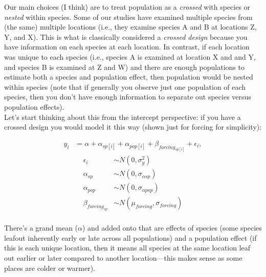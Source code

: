 \documentclass[11pt,letter]{article}
\begin{document}
Our main choices (I think) are to treat population as a \emph{crossed} with species or \emph{nested} within species. Some of our studies have examined multiple species from (the same) multiple locations (i.e., they examine species A and B at locations Z, Y, and X). This is what is classically considered a \emph{crossed design} because you have information on each species at each location. In contrast, if each location was unique to each species (i.e., species A is examined at location X and and Y, and species B is examined at Z and W) and there are enough populations to estimate both a species and population effect, then population would be nested within species (note that if generally you observe just one population of each species, then you don't have enough information to separate out species versus population effects). \\

Let's start thinking about this from the intercept perspective: if you have a crossed design you would model it this way (shown just for forcing for simplicity):

\begin{align*}
y_i &= \alpha +  \alpha_{sp[i]} + \alpha_{pop[i]} + \beta_{forcing_{sp[i]}}  + \epsilon_i,
\end{align*}
\begin{align*}
\epsilon_i & \sim N(0,\sigma^2_y) \\
\alpha_{sp} & \sim N(0, \sigma_{\alpha sp}) \\
\alpha_{pop} & \sim N(0, \sigma_{\alpha pop}) \\
\beta_{forcing_{sp}} & \sim N(\mu_{forcing}, \sigma_{forcing}) \\
\end{align*}

There's a grand mean ($\alpha$) and added onto that are effects of species (some species leafout inherently early or late across all populations) and a population effect (if this is each unique location, then it means all species at the same location leaf out earlier or later compared to another location---this makes sense as some places are colder or warmer). \\
\end{document}
